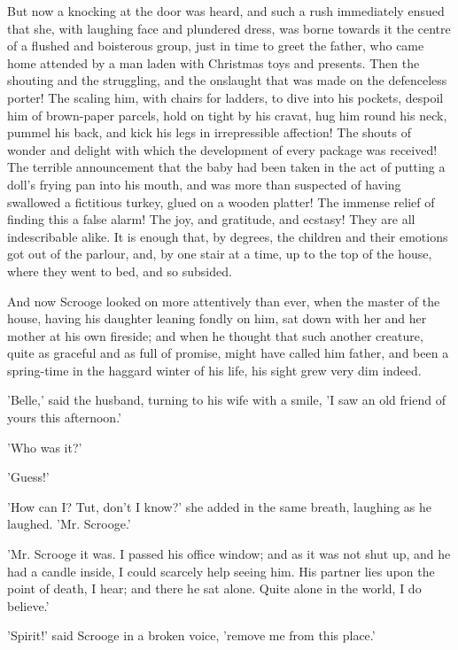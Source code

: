 
But now a knocking at the door was heard, and such a rush immediately
ensued that she, with laughing face and plundered dress, was borne
towards it the centre of a flushed and boisterous group, just in time to
greet the father, who came home attended by a man laden with Christmas
toys and presents. Then the shouting and the struggling, and the
onslaught that was made on the defenceless porter! The scaling him, with
chairs for ladders, to dive into his pockets, despoil him of
brown-paper parcels, hold on tight by his cravat, hug him round his
neck, pummel his back, and kick his legs in irrepressible affection! The
shouts of wonder and delight with which the development of every package
was received! The terrible announcement that the baby had been taken in
the act of putting a doll's frying pan into his mouth, and was more than
suspected of having swallowed a fictitious turkey, glued on a wooden
platter! The immense relief of finding this a false alarm! The joy, and
gratitude, and ecstasy! They are all indescribable alike. It is enough
that, by degrees, the children and their emotions got out of the
parlour, and, by one stair at a time, up to the top of the house, where
they went to bed, and so subsided.

And now Scrooge looked on more attentively than ever, when the master of
the house, having his daughter leaning fondly on him, sat down with her
and her mother at his own fireside; and when he thought that such
another creature, quite as graceful and as full of promise, might have
called him father, and been a spring-time in the haggard winter of his
life, his sight grew very dim indeed.

'Belle,' said the husband, turning to his wife with a smile, 'I saw an
old friend of yours this afternoon.'

'Who was it?'

'Guess!'

'How can I? Tut, don't I know?' she added in the same breath, laughing
as he laughed. 'Mr. Scrooge.'

'Mr. Scrooge it was. I passed his office window; and as it was not shut
up, and he had a candle inside, I could scarcely help seeing him. His
partner lies upon the point of death, I hear; and there he sat alone.
Quite alone in the world, I do believe.'

'Spirit!' said Scrooge in a broken voice, 'remove me from this place.'

